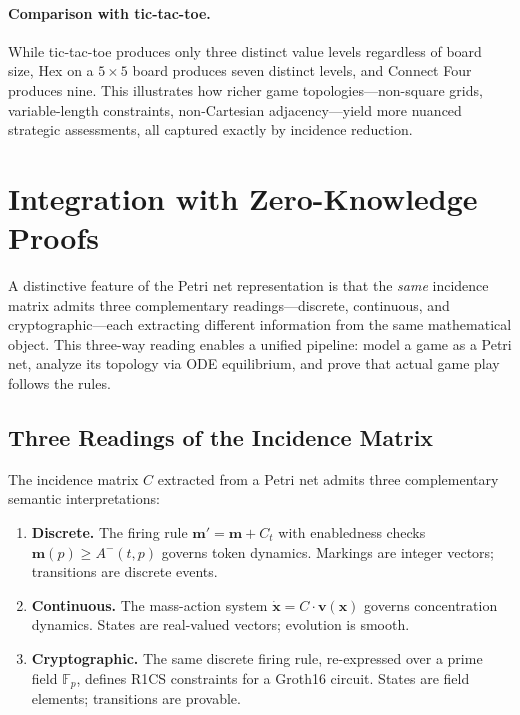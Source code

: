 \documentclass[11pt,a4paper]{article}
\begin{document}
\paragraph{Comparison with tic-tac-toe.}
While tic-tac-toe produces only three distinct value levels regardless of board size, Hex on a $5 \times 5$ board produces seven distinct levels, and Connect Four produces nine.
This illustrates how richer game topologies---non-square grids, variable-length constraints, non-Cartesian adjacency---yield more nuanced strategic assessments, all captured exactly by incidence reduction.

\section{Integration with Zero-Knowledge Proofs}
\label{sec:zk}

A distinctive feature of the Petri net representation is that the \emph{same} incidence matrix admits three complementary readings---discrete, continuous, and cryptographic---each extracting different information from the same mathematical object.
This three-way reading enables a unified pipeline: model a game as a Petri net, analyze its topology via ODE equilibrium, and prove that actual game play follows the rules.

\subsection{Three Readings of the Incidence Matrix}

The incidence matrix $C$ extracted from a Petri net admits three complementary semantic interpretations:
\begin{enumerate}
  \item \textbf{Discrete.}  The firing rule $\mathbf{m}' = \mathbf{m} + C_t$ with enabledness checks $\mathbf{m}(p) \geq A^-(t,p)$ governs token dynamics.  Markings are integer vectors; transitions are discrete events.
  \item \textbf{Continuous.}  The mass-action system $\dot{\mathbf{x}} = C \cdot \mathbf{v}(\mathbf{x})$ governs concentration dynamics.  States are real-valued vectors; evolution is smooth.
  \item \textbf{Cryptographic.}  The same discrete firing rule, re-expressed over a prime field $\mathbb{F}_p$, defines R1CS constraints for a Groth16 circuit.  States are field elements; transitions are provable.
\end{enumerate}
\end{document}
